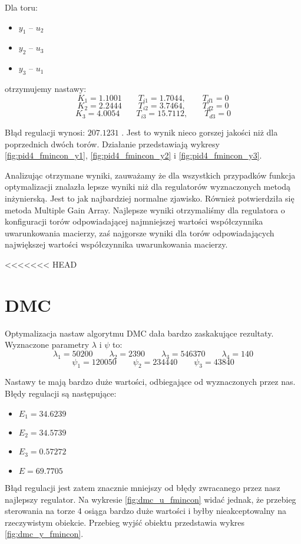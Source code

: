 Dla toru:
\begin{itemize}
  \item $y_1$ -- $u_2$
 \item $y_2$ -- $u_3$
 \item $y_3$ -- $u_1$
\end{itemize}

otrzymujemy nastawy:
\begin{equation}
  K_1 = \num{1,1001} \qquad T_{i1} = \num{1,7044}, \qquad T_{d1} = 0 \nonumber
\end{equation}
\begin{equation}
  K_2 = \num{2,2444} \qquad T_{i2} = \num{3,7464}, \qquad T_{d2} = 0
\end{equation}
\begin{equation}
  K_3 = \num{4,0054} \qquad T_{i3} = \num{15,7112}, \qquad T_{d3} = 0 \nonumber
\end{equation}

Błąd regulacji wynosi: $\num{207,1231}$ .
Jest to wynik nieco gorszej jakości niż dla poprzednich dwóch torów.
Działanie
przedstawiają wykresy \ref{fig:pid4_fmincon_y1}, \ref{fig:pid4_fmincon_y2} i \ref{fig:pid4_fmincon_y3}.

Analizując otrzymane wyniki, zauważamy że dla wszystkich przypadków funkcja optymalizacji
znalazła lepsze wyniki niż dla regulatorów wyznaczonych metodą inżynierską. Jest to jak najbardziej normalne zjawisko.
Również potwierdziła się metoda Multiple Gain Array. Najlepsze wyniki otrzymaliśmy dla regulatora o konfiguracji
torów odpowiadającej najmniejszej wartości współczynnika uwarunkowania macierzy, zaś najgorsze wyniki
dla torów odpowiadających największej wartości współczynnika uwarunkowania macierzy.

<<<<<<< HEAD
\section{DMC}
Optymalizacja nastaw algorytmu DMC dała bardzo zaskakujące rezultaty. Wyznaczone parametry $\lambda$ i $\psi$ to:
\begin{equation}
\lambda_1=\num{50200} \qquad \lambda_2 = 2390 \qquad \lambda_3 = 546370 \qquad \lambda_4 = 140
\end{equation}
\begin{equation}
\psi_1 = 120050 \qquad \psi_2 = 234440 \qquad \psi_3 = 43840
\end{equation}

Nastawy te mają bardzo duże wartości, odbiegające od wyznaczonych przez nas. Błędy regulacji są następujące:
\begin{itemize}
\item $E_1 = \num{34,6239}$
\item $E_2 = \num{34,5739}$
\item $E_3 = \num{0,57272}$
\item $E = \num{69,7705}$
\end{itemize}
Błąd regulacji jest zatem znacznie mniejszy od błędy zwracanego przez nasz najlepszy regulator. Na wykresie \ref{fig:dmc_u_fmincon} widać jednak, że przebieg sterowania na torze 4 osiąga bardzo duże wartości i byłby nieakceptowalny na rzeczywistym obiekcie. Przebieg wyjść obiektu przedstawia wykres \ref{fig:dmc_y_fmincon}.

